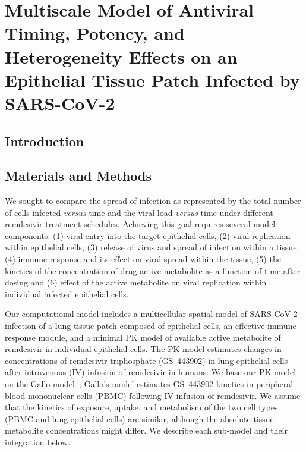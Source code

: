 \chapter{Multiscale Model of Antiviral Timing, Potency, and Heterogeneity Effects on an Epithelial Tissue Patch Infected by SARS-CoV-2}\label{cha:remdes}

\section{Introduction}\label{sec:remdes:intro}



\section{Materials and Methods}\label{sec:remdes:met}
We sought to compare the spread of infection as represented by the total number of cells infected \textit{versus} time and the viral load \textit{versus} time under different remdesivir treatment schedules. Achieving this goal requires several model components:  (1) viral entry into the target epithelial cells, (2) viral replication within epithelial cells, (3) release of virus and spread of infection within a tissue, (4) immune response and its effect on viral spread within the tissue, (5) the kinetics of the concentration of drug active metabolite as a function of time after dosing and (6) effect of the active metabolite on viral replication within individual infected epithelial cells.

Our computational model includes a multicellular spatial model of SARS-CoV-2 infection of a lung tissue patch composed of epithelial cells, an effective immune response module, and a minimal PK model of available active metabolite of remdesivir in individual epithelial cells. The PK model estimates changes in concentrations of remdesivir triphosphate (GS--443902) in lung epithelial cells after intravenous (IV) infusion of remdesivir in humans. We base our PK model on the Gallo model~\cite{gallo_hybrid_2021}; Gallo's model estimates GS--443902 kinetics in peripheral blood mononuclear cells (PBMC) following IV infusion of remdesivir. We assume that the kinetics of exposure, uptake, and metabolism of the two cell types (PBMC and lung epithelial cells) are similar, although the absolute tissue metabolite concentrations might differ. We describe each sub-model and their integration below.

